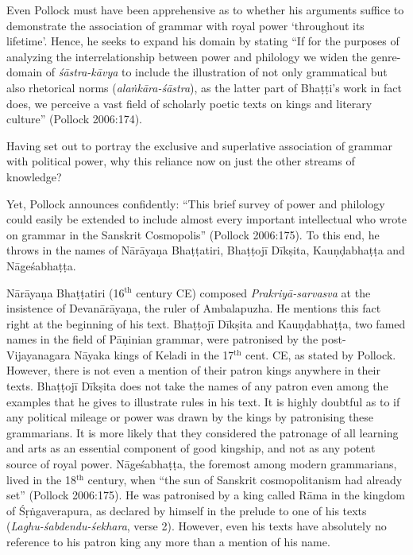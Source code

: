Even Pollock must have been apprehensive as to whether his arguments suffice to demonstrate the association of grammar with royal power `throughout its lifetime'. Hence, he seeks to expand his domain by stating ``If for the purposes of analyzing the interrelationship between power and philology we widen the genre-domain of {\sl śāstra-kāvya} to include the illustration of not only grammatical but also rhetorical norms ({\sl alaṅkāra-śāstra}), as the latter part of Bhaṭṭi's work in fact does, we perceive a vast field of scholarly poetic texts on kings and literary culture'' (Pollock 2006:174). 

Having set out to portray the exclusive and superlative association of grammar with political power, why this reliance now on just the other streams of knowledge?

Yet, Pollock announces confidently:  ``This brief survey of power and philology could easily be extended to include almost every important intellectual who wrote on grammar in the Sanskrit Cosmopolis'' (Pollock 2006:175). To this end, he throws in the names of Nārāyaṇa Bhaṭṭatiri, Bhaṭṭojī Dīkṣita, Kauṇḍabhaṭṭa and Nāgeśabhaṭṭa.

Nārāyaṇa Bhaṭṭatiri (16$^{\text{th}}$ century CE) composed {\sl Prakriyā-sarvasva} at the insistence of Devanārāyaṇa, the ruler of Ambalapuzha. He mentions this fact right at the beginning of his text. Bhaṭṭojī Dīkṣita and Kauṇḍabhaṭṭa, two famed names in the field of Pāṇinian grammar, were patronised by the post-Vijayanagara Nāyaka kings of Keladi in the 17$^{\text{th}}$ cent. CE, as stated by Pollock. However, there is not even a mention of their patron kings anywhere in their texts. Bhaṭṭojī Dīkṣita does not take the names of any patron even among the examples that he gives to illustrate rules in his text. It is highly doubtful as to if any political mileage or power was drawn by the kings by patronising these grammarians. It is more likely that they considered the patronage of all learning and arts as an essential component of good kingship, and not as any potent source of royal power. Nāgeśabhaṭṭa, the foremost among modern grammarians, lived in the 18$^{\text{th}}$ century, when ``the sun of Sanskrit cosmopolitanism had already set'' (Pollock 2006:175). He was patronised by a king called Rāma in the kingdom of Śṛṅgaverapura, as declared by himself in the prelude to one of his texts ({\sl Laghu-śabdendu-śekhara}, verse 2). However, even his texts have absolutely no reference to his patron king any more than a mention of his name. 

